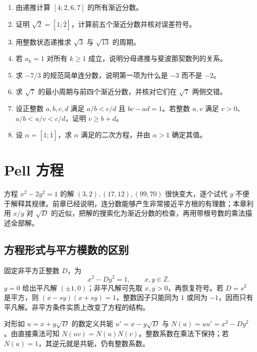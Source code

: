 \documentclass[UTF8,12pt,a4paper,fontset=fandol]{ctexbook}
\begin{document}
\begin{enumerate}
 \item 由递推计算 $[4;2,6,7]$ 的所有渐近分数。
 \item 证明 $\sqrt2=[1;\overline2]$，计算前五个渐近分数并核对误差符号。
 \item 用整数状态递推求 $\sqrt3$ 与 $\sqrt{13}$ 的周期。
 \item 若 $a_k=1$ 对所有 $k\ge1$ 成立，说明分母递推与斐波那契数列的关系。
 \item\label{ex:cf-negative} 求 $-7/3$ 的规范简单连分数，说明第一项为什么是 $-3$ 而不是 $-2$。
 \item\label{ex:cf-sqrt-seven} 求 $\sqrt7$ 的最小周期与前四个渐近分数，并核对它们在 $\sqrt7$ 两侧交错。
 \item\label{ex:cf-neighbors} 设正整数 $a,b,c,d$ 满足 $a/b<c/d$ 且 $bc-ad=1$。若整数 $u,v$ 满足 $v>0$、$a/b<u/v<c/d$，证明 $v\ge b+d$。
 \item\label{ex:cf-golden} 设 $\alpha=[1;\overline1]$，求 $\alpha$ 满足的二次方程，并由 $\alpha>1$ 确定其值。
\end{enumerate}

\chapter{Pell 方程}
\label{ch:pell}

方程 $x^2-2y^2=1$ 的解 $(3,2),(17,12),(99,70)$ 很快变大，逐个试代 $y$ 不便于解释其规律。前章已经说明，连分数能够产生非常接近平方根的有理数；本章利用 $x/y$ 对 $\sqrt D$ 的近似，把解的搜索化为渐近分数的检查，再用带根号数的乘法描述全部解。

\section{方程形式与平方模数的区别}

固定非平方正整数 $D$，为
\begin{equation}
 x^2-Dy^2=1,\qquad x,y\in\mathbb Z.
 \label{eq:pell-equation}
\end{equation}
$y=0$ 给出平凡解 $(\pm1,0)$；非平凡解可先取 $x,y>0$，再恢复符号。若 $D=s^2$ 是平方，则 $(x-sy)(x+sy)=1$，整数因子只能同为 $1$ 或同为 $-1$，因而只有平凡解。非平方条件实质上改变了方程的结构。

对形如 $u=x+y\sqrt D$ 的数定义共轭 $u'=x-y\sqrt D$ 与 $N(u)=uu'=x^2-Dy^2$。由直接乘法可知 $N(uv)=N(u)N(v)$。整数系数在乘法下保持；若 $N(u)=1$，其逆元就是共轭，仍有整数系数。
\end{document}
